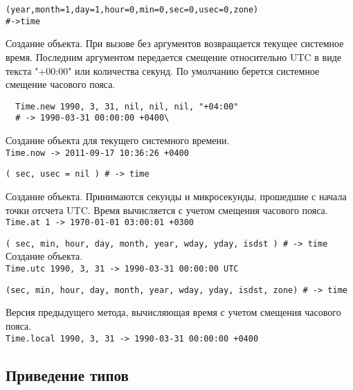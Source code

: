 \begin{methodlist}
  \begin{alltt}
  (year, month = 1, day = 1, hour = 0, min = 0, sec = 0, usec = 0, zone)
  # -> time\
  \end{alltt}
  Создание объекта. При вызове без аргументов возвращается текущее системное время. Последним аргументом передается смещение относительно UTC в виде текста "+00:00" или количества секунд. По умолчанию берется системное смещение часового пояса.
  \begin{verbatim}
  Time.new 1990, 3, 31, nil, nil, nil, "+04:00" 
  # -> 1990-03-31 00:00:00 +0400\
  \end{verbatim} 
   
  Создание объекта для текущего системного времени. 
  \\\verb!Time.now -> 2011-09-17 10:36:26 +0400!
 
  \verb!( sec, usec = nil ) # -> time!

  Создание объекта. Принимаются секунды и микросекунды, прошедшие с начала точки отсчета UTC. Время вычисляется с учетом смещения часового пояса. 
  \\\verb!Time.at 1 -> 1970-01-01 03:00:01 +0300!

  \verb!( sec, min, hour, day, month, year, wday, yday, isdst ) # -> time!
  \alias{gm} 
  Создание объекта.   
  \\\verb!Time.utc 1990, 3, 31 -> 1990-03-31 00:00:00 UTC!
 
  \verb!(sec, min, hour, day, month, year, wday, yday, isdst, zone) # -> time! 

  \alias{time} 
  Версия предыдущего метода, вычисляющая время с учетом смещения часового пояса. 
  \\\verb!Time.local 1990, 3, 31 -> 1990-03-31 00:00:00 +0400!
\end{methodlist}

\subsection*{Приведение типов} 

